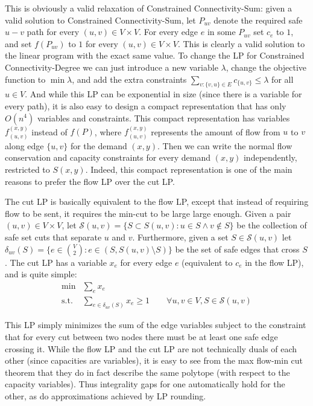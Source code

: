 \documentclass[11pt,letterpaper]{article}
\theoremstyle{definition}
\newcounter{note}[section]
\begin{document}
 This is obviously a valid relaxation of {\sc
  Constrained Connectivity-Sum}: given a valid solution to
{\sc Constrained Connectivity-Sum}, let $P_{uv}$ denote the required
safe $u-v$ path for every $(u,v) \in V \times V$.  For every edge $e$
in some $P_{uv}$ set $c_e$ to $1$, and set $f(P_{uv})$ to $1$ for
every $(u,v) \in V \times V$.  This is clearly a valid
solution to the linear program with the exact same value.  To change
the LP for {\sc Constrained Connectivity-Degree} we can just introduce
a new variable $\lambda$, change the objective function to $\min
\lambda$, and add the extra constraints $\sum_{v: \{v,u\} \in E} c_{\{u,v\}}
\leq \lambda$ for all $u \in V$.  And while this LP can be exponential in size (since there is a variable for every path), it is also easy to design a compact representation that has only $O(n^4)$ variables and constraints.  This compact representation has variables $f_{(u,v)}^{(x,y)}$ instead of $f(P)$, where $f_{(u,v)}^{(x,y)}$ represents the amount of flow from $u$ to $v$ along edge $\{u,v\}$ for the demand $(x,y)$.    Then we can write the normal flow conservation and capacity constraints for every demand $(x,y)$ independently, restricted to $S(x,y)$.  Indeed, this compact representation is one of the main reasons to prefer the flow LP over the cut LP.

The cut LP is basically equivalent to the flow LP, except that instead of requiring flow to be sent, it requires the min-cut to be large large enough. Given a pair $(u,v) \in V \times V$, let
$\mathcal{S}(u,v) = \{S \subset S(u,v) : u \in S \land v \not\in S\}$
be the collection of safe set cuts that separate $u$ and $v$.
Furthermore, given a set $S \in \mathcal{S}(u,v)$ let $\delta_{uv}(S)
= \{e \in {V \choose 2} : e \in (S, S(u,v) \setminus S)\}$ be the set
of safe edges that cross $S$.  The cut LP has a variable $x_e$ for
every edge $e$ (equivalent to $c_e$ in the flow LP), and is quite simple:
\begin{align*}
\min &\sum_e x_e \\
\text{s.t. } &\sum_{e \in \delta_{uv}(S)} x_e \geq 1 \qquad
\forall u,v \in V, S \in \mathcal{S}(u,v)
\end{align*}

This LP simply minimizes the sum of the edge variables subject to the
constraint that for every cut between two nodes there must be at least
one safe edge crossing it.  While the flow LP and the cut LP are not technically duals of each other (since capacities are variables), it is easy to see from the max flow-min cut theorem that they do in fact describe the same polytope (with respect to the capacity variables).  Thus integrality gaps for one automatically hold for the other, as do approximations achieved by LP rounding.
\end{document}

